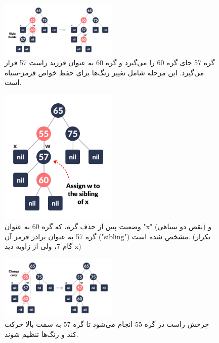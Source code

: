 \documentclass[a4paper,12pt]{article}
\begin{document}
	\begin{figure}[H]
		\centering
		\includegraphics[width=0.5\textwidth]{img/advancedDelFix/delete-9-red-black.png} %
		\caption{گره 57 جای گره 60 را می‌گیرد و گره 60 به عنوان فرزند راست 57 قرار می‌گیرد. این مرحله شامل تغییر رنگ‌ها برای حفظ خواص قرمز-سیاه است.}
	\end{figure}
	
	\begin{figure}[H]
		\centering
		\includegraphics[width=0.5\textwidth]{img/advancedDelFix/delete-10-red-black.png} %
		\caption{وضعیت پس از حذف گره، که گره 60 به عنوان "x" (نقص دو سیاهی) و گره 57 به عنوان برادر قرمز آن ("sibling") مشخص شده است. (تکرار گام 7، ولی از زاویه دید x)}
	\end{figure}
	
	\begin{figure}[H]
		\centering
		\includegraphics[width=0.5\textwidth]{img/advancedDelFix/delete-11-red-black.png} %
		\caption{چرخش راست در گره 55 انجام می‌شود تا گره 57 به سمت بالا حرکت کند و رنگ‌ها تنظیم شوند.}
	\end{figure}
	
\end{document}
